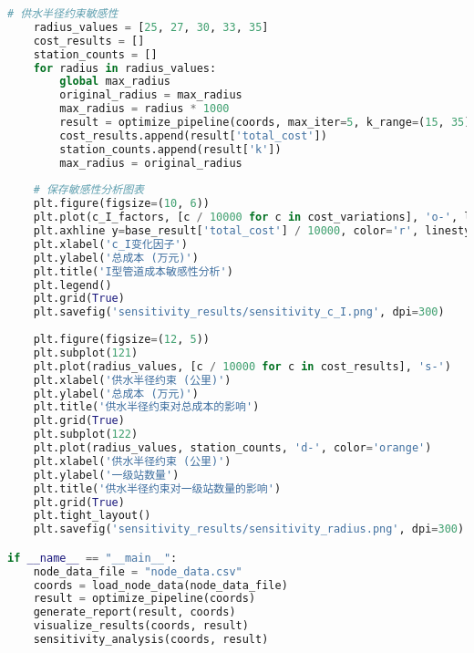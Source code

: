 \documentclass[12pt,a4paper]{article}
\begin{document}
\begin{lstlisting}[language=Python]
    # 供水半径约束敏感性
    radius_values = [25, 27, 30, 33, 35]
    cost_results = []
    station_counts = []
    for radius in radius_values:
        global max_radius
        original_radius = max_radius
        max_radius = radius * 1000
        result = optimize_pipeline(coords, max_iter=5, k_range=(15, 35))
        cost_results.append(result['total_cost'])
        station_counts.append(result['k'])
        max_radius = original_radius
    
    # 保存敏感性分析图表
    plt.figure(figsize=(10, 6))
    plt.plot(c_I_factors, [c / 10000 for c in cost_variations], 'o-', label='总成本')
    plt.axhline y=base_result['total_cost'] / 10000, color='r', linestyle='--', label='基准成本'
    plt.xlabel('c_I变化因子')
    plt.ylabel('总成本 (万元)')
    plt.title('I型管道成本敏感性分析')
    plt.legend()
    plt.grid(True)
    plt.savefig('sensitivity_results/sensitivity_c_I.png', dpi=300)
    
    plt.figure(figsize=(12, 5))
    plt.subplot(121)
    plt.plot(radius_values, [c / 10000 for c in cost_results], 's-')
    plt.xlabel('供水半径约束 (公里)')
    plt.ylabel('总成本 (万元)')
    plt.title('供水半径约束对总成本的影响')
    plt.grid(True)
    plt.subplot(122)
    plt.plot(radius_values, station_counts, 'd-', color='orange')
    plt.xlabel('供水半径约束 (公里)')
    plt.ylabel('一级站数量')
    plt.title('供水半径约束对一级站数量的影响')
    plt.grid(True)
    plt.tight_layout()
    plt.savefig('sensitivity_results/sensitivity_radius.png', dpi=300)

if __name__ == "__main__":
    node_data_file = "node_data.csv"
    coords = load_node_data(node_data_file)
    result = optimize_pipeline(coords)
    generate_report(result, coords)
    visualize_results(coords, result)
    sensitivity_analysis(coords, result)
\end{lstlisting}
\end{document}
